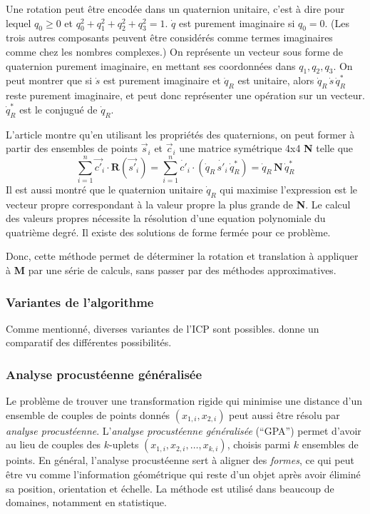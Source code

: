 \documentclass[a4paper,10pt]{scrreprt}
\begin{document}
Une rotation peut être encodée dans un quaternion unitaire, c'est à dire pour lequel $q_0 \geq 0$ et $q_0^2 + q_1^2 + q_2^2 + q_3^2 = 1$. $\dot{q}$ est purement imaginaire si $q_0 = 0$. (Les trois autres composants peuvent être considérés comme termes imaginaires comme chez les nombres complexes.) On représente un vecteur sous forme de quaternion purement imaginaire, en mettant ses coordonnées dans $q_1, q_2, q_3$. On peut montrer que si $\dot{s}$ est purement imaginaire et $\dot{q}_R$ est unitaire, alors $\dot{q}_R \, \dot{s} \, \dot{q}^*_R$ reste purement imaginaire, et peut donc représenter une opération sur un vecteur. $\dot{q}^*_R$ est le conjugué de $\dot{q}_R$.

L'article \cite{Horn1986} montre qu'en utilisant les propriétés des quaternions, on peut former à partir des ensembles de points $\vec{s}_i$ et $\vec{c}_i$ une matrice symétrique 4x4 \textbf{N} telle que
\begin{equation}
	\sum_{i=1}^{n} \vec{c'}_{i} \cdot \mathbf{R}(\vec{s'}_i) =
	\sum_{i=1}^{n} \dot{c'}_{i} \cdot (\dot{q}_R \, \dot{s'}_{i} \, \dot{q}^*_R) =
	\dot{q}_R \, \mathbf{N} \, \dot{q}^*_R
\end{equation}
Il est aussi montré que le quaternion unitaire $\dot{q}_R$ qui maximise l'expression est le vecteur propre correspondant à la valeur propre la plus grande de \textbf{N}. Le calcul des valeurs propres nécessite la résolution d'une equation polynomiale du quatrième degré. Il existe des solutions de forme fermée pour ce problème.

Donc, cette méthode permet de déterminer la rotation et translation à appliquer à \textbf{M} par une série de calculs, sans passer par des méthodes approximatives.


\subsubsection{Variantes de l'algorithme}
Comme mentionné, diverses variantes de l'ICP sont possibles. \cite{Rusi2001} donne un comparatif des différentes possibilités.

\subsubsection{Analyse procustéenne généralisée}
Le problème de trouver une transformation rigide qui minimise une distance d'un ensemble de couples de points donnés ${(x_{1,i}, x_{2,i})}$ peut aussi être résolu par \emph{analyse procustéenne}. L'\emph{analyse procustéenne généralisée} (``GPA'') permet d'avoir au lieu de couples des $k$-uplets ${(x_{1,i}, x_{2,i}, \ldots, x_{k,i})}$, choisis parmi $k$ ensembles de points. En général, l'analyse procustéenne sert à aligner des \emph{formes}, ce qui peut être vu comme l'information géométrique qui reste d'un objet après avoir éliminé sa position, orientation et échelle. La méthode est utilisé dans beaucoup de domaines, notamment en statistique.
\end{document}

